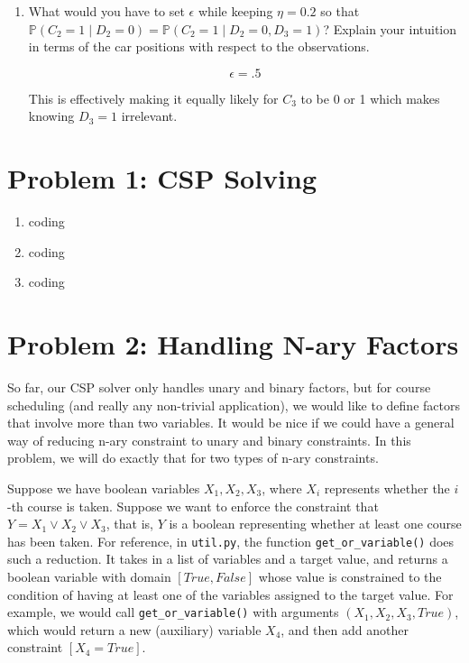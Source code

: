 \documentclass[10pt]{article}
\begin{document}
\begin{enumerate}[label=(\alph*)]
\begin{enumerate}[label=(\roman*)]
		\item What would you have to set $\epsilon$ while keeping $\eta = 0.2$ so that $\mathbb{P}(C_2 = 1 \mid D_2 = 0) = \mathbb{P}(C_2 = 1 \mid D_2 = 0, D_3 = 1)$? Explain your intuition in terms of the car positions with respect to the observations.
		
		$$\epsilon = .5$$
		
		This is effectively making it equally likely for $C_3$ to be 0 or 1 which makes knowing $D_3 = 1$ irrelevant.
		
	\end{enumerate}

\end{enumerate}
\iffalse
\section*{\normalsize Problem 1: CSP Solving}

\begin{enumerate}[label=(\alph*)]

  \item coding
  
  \item coding
  
  \item coding

\end{enumerate}

\section*{\normalsize Problem 2: Handling N-ary Factors}

So far, our CSP solver only handles unary and binary factors, but for course scheduling (and really any non-trivial application), we would like to define factors that involve more than two variables. It would be nice if we could have a general way of reducing n-ary constraint to unary and binary constraints. In this problem, we will do exactly that for two types of n-ary constraints.
\smallskip

Suppose we have boolean variables $X_1, X_2, X_3$, where $X_i$ represents whether the $i$-th course is taken. Suppose we want to enforce the constraint that $Y = X_1 \vee X_2 \vee X_3$, that is, $Y$ is a boolean representing whether at least one course has been taken. For reference, in \texttt{util.py}, the function \texttt{get\_or\_variable()} does such a reduction. It takes in a list of variables and a target value, and returns a boolean variable with domain $[True, False]$ whose value is constrained to the condition of having at least one of the variables assigned to the target value. For example, we would call \texttt{get\_or\_variable()} with arguments $(X_1, X_2, X_3, True)$, which would return a new (auxiliary) variable $X_4$, and then add another constraint $[X_4 = True]$.
\smallskip
\end{document}

